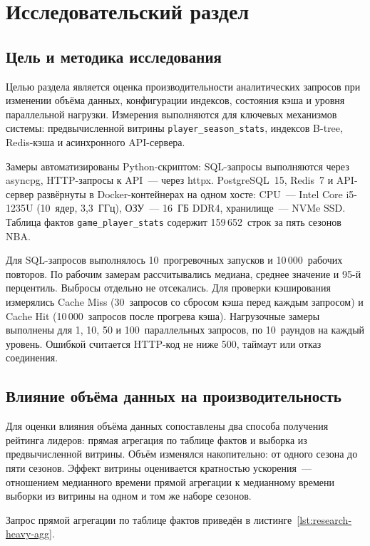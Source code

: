 ﻿\chapter{Исследовательский раздел}

\section{Цель и методика исследования}

Целью раздела является оценка производительности аналитических запросов
при изменении объёма данных, конфигурации индексов, состояния кэша и уровня
параллельной нагрузки. Измерения выполняются для ключевых механизмов системы:
предвычисленной витрины \texttt{player\_season\_stats}, индексов B-tree,
Redis-кэша и асинхронного API-сервера.

Замеры автоматизированы Python-скриптом: SQL-запросы выполняются через
asyncpg, HTTP-запросы к API~--- через httpx. PostgreSQL~15, Redis~7
и API-сервер развёрнуты в Docker-контейнерах на одном хосте:
CPU~--- Intel Core i5-1235U (10~ядер, 3{,}3~ГГц), ОЗУ~--- 16~ГБ DDR4,
хранилище~--- NVMe SSD. Таблица фактов \texttt{game\_player\_stats}
содержит 159\,652~строк за пять сезонов NBA.

Для SQL-запросов выполнялось 10~прогревочных запусков и 10\,000~рабочих
повторов. По рабочим замерам рассчитывались медиана, среднее значение
и 95-й перцентиль. Выбросы отдельно не отсекались. Для проверки кэширования
измерялись Cache Miss (30~запросов со сбросом кэша перед каждым запросом)
и Cache Hit (10\,000~запросов после прогрева кэша). Нагрузочные замеры выполнены
для 1, 10, 50 и 100~параллельных запросов, по 10~раундов на каждый уровень.
Ошибкой считается HTTP-код не ниже 500, таймаут или отказ соединения.

\section{Влияние объёма данных на производительность}

Для оценки влияния объёма данных сопоставлены два способа получения рейтинга
лидеров: прямая агрегация по таблице фактов и выборка из предвычисленной
витрины. Объём изменялся накопительно: от одного сезона до пяти сезонов.
Эффект витрины оценивается кратностью ускорения~--- отношением медианного
времени прямой агрегации к медианному времени выборки из витрины на одном
и том же наборе сезонов.

Запрос прямой агрегации по таблице фактов приведён
в листинге~\ref{lst:research-heavy-agg}.

